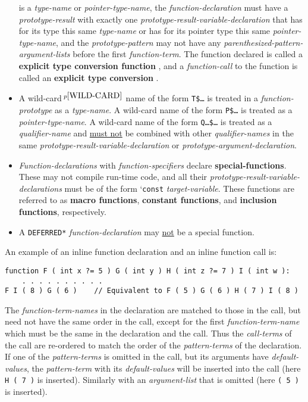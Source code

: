 \documentclass[12pt]{article}
\newcommand{\key}[1]{{\rm \bfseries #1}}
\newcommand{\skey}[2]{{\rm \bfseries #1#2}}
\newcommand{\pagnote}[1]{$\,^{p\pageref{#1}}$}
\newenvironment{indpar}[1][0.3in]%
	{\begin{list}{}%
		     {\setlength{\itemsep}{0in}%
		      \setlength{\topsep}{0in}%
		      \setlength{\parsep}{1ex}%
		      \setlength{\labelwidth}{#1}%
		      \setlength{\leftmargin}{#1}%
		      \addtolength{\leftmargin}{\labelsep}}%
	 \item}%
	{\end{list}}
\begin{document}
\begin{itemize}
is a {\em type-name} or {\em pointer-type-name},
the {\em function-declaration} must have
a {\em prototype-result} with exactly
one {\em prototype-result-variable-declaration}
that has for its type this same {\em type-name} or has for its pointer type
this same {\em pointer-type-name},
and the {\em prototype-pattern} may not have any
{\em parenthesized-pattern-argument-lists} before the first
{\em function-term}.  The function
declared is called a \key{explicit type conversion function}%
\label{EXPLICIT-TYPE-CONVERSION-FUNCTION}, and a {\em function-call}
to the function is called an \key{explicit type conversion}%
\label{EXPLICIT-TYPE-CONVERSION}.
\item
A wild-card\pagnote{WILD-CARD} name of the form {\tt T\$\ldots}
is treated in a {\em function-prototype} as a {\em type-name}.
A wild-card name of the form {\tt P\$\ldots} is treated as a
{\em pointer-type-name}.
A wild-card name of the form {\tt Q\ldots\$\ldots} is treated as a
{\em qualifier-name} and \underline{must not} be combined with
other {\em qualifier-names} in the same
{\em prototype-result-variable-declaration}
or {\em prototype-argument-declaration}.
\item
{\em Function-declarations} with {\em function-specifiers} declare
\skey{special-function}s.  These may not compile run-time code,
and all their {\em prototype-result-variable-declarations}
must be of the form `{\tt const} {\em target-variable}.
These functions are referred to as \skey{macro function}s,
\skey{constant function}s, and \skey{inclusion function}s, respectively.
\item
A {\tt *DEFERRED*} {\em function-declaration} may \underline{not} be
a special function.

\end{itemize}

An example of an inline function declaration and an inline function call is:
\begin{indpar}\begin{verbatim}
function F ( int x ?= 5 ) G ( int y ) H ( int z ?= 7 ) I ( int w ):
    . . . . . . . . . .
F I ( 8 ) G ( 6 )    // Equivalent to F ( 5 ) G ( 6 ) H ( 7 ) I ( 8 )
\end{verbatim}\end{indpar}

The {\em function-term-names} in the declaration are matched to those
in the call, but need not have the same order in the call, except for
the first {\em function-term-name} which must be the same in the
declaration and the call.  Thus the {\em call-terms} of the call
are re-ordered to match the order of the {\em pattern-terms} of the
declaration.  If one of the {\em pattern-terms} is omitted in the
call, but its arguments have {\em default-values},
the {\em pattern-term} with its
{\em default-values} will be inserted into the call
(here {\tt H ( 7 )} is inserted).
Similarly with an {\em argument-list} that is omitted
(here {\tt ( 5 )} is inserted).
\end{document}

